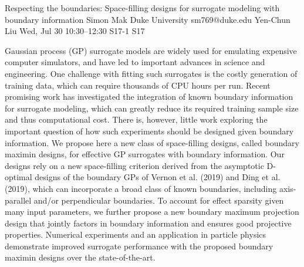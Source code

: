 \begin{talk}
  {Respecting the boundaries: Space-filling designs for surrogate modeling with boundary information}%
  {Simon Mak}%
  {Duke University}%
  {sm769@duke.edu}%
  {Yen-Chun Liu}%
  {}%
  {Wed, Jul 30 10:30–12:30}%
  {S17-1}%
  {S17}%
  
				
			
Gaussian process (GP) surrogate models are widely used for emulating expensive computer simulators, and have led to important advances in science and engineering. One challenge with fitting such surrogates is the costly generation of training data, which can require thousands of CPU hours per run. Recent promising work has investigated the integration of known boundary information for surrogate modeling, which can greatly reduce its required training sample size and thus computational cost. There is, however, little work exploring the important question of how such experiments should be designed given boundary information. We propose here a new class of space-filling designs, called boundary maximin designs, for effective GP surrogates with boundary information. Our designs rely on a new space-filling criterion derived from the asymptotic D-optimal designs of the boundary GPs of Vernon et al. (2019) and Ding et al. (2019), which can incorporate a broad class of known boundaries, including axis-parallel and/or perpendicular boundaries. To account for effect sparsity given many input parameters, we further propose a new boundary maximum projection design that jointly factors in boundary information and ensures good projective properties. Numerical experiments and an application in particle physics demonstrate improved surrogate performance with the proposed boundary maximin designs over the state-of-the-art.
\medskip


\end{talk}

